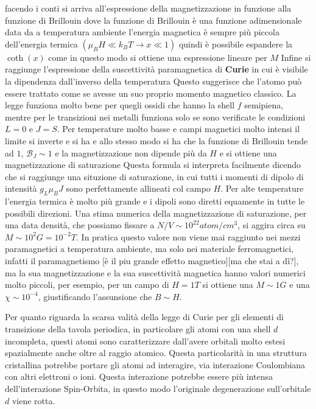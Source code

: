facendo i conti si arriva all'espressione della magnetizzazione in funzione alla funzione di Brillouin
dove la funzione di Brillouin è una funzione adimensionale data da
a temperatura ambiente l'energia magnetica è sempre più piccola dell'energia termica $(\mu_B H \ll k_BT \to x\ll 1)$ quindi è possibile espandere la $\coth(x)$ come  
in questo modo si ottiene una espressione lineare per $M$
Infine si raggiunge l'espressione della suscettività paramagnetica di \textbf{Curie} in cui è visibile la dipendenza dall'inverso della temperatura
Questo suggerisce che l'atomo può essere trattato come se avesse un suo proprio momento magnetico classico. La legge funziona molto bene per quegli ossidi che hanno la shell $f$ semipiena, mentre per le transizioni nei metalli funziona solo se sono verificate le condizioni $L=0$ e $J=S$. Per temperature molto basse e campi magnetici molto intensi il limite si inverte e si ha
e allo stesso modo si ha che la funzione di Brillouin tende ad $1$, $\mathcal{B}_J \sim 1$ e la magnetizzazione non dipende più da $H$ e si ottiene una magnetizzazione di saturazione
Questa formula si interpreta facilmente dicendo che si raggiunge una situzione di saturazione, in cui tutti i momenti di dipolo di intensit\`a $g_L \mu_B J$ sono perfettamente allineati col campo $H$. Per alte temperature l'energia termica \`e molto pi\`u grande e i dipoli sono diretti equamente in tutte le possibili direzioni. Una stima numerica della magnetizzazione di saturazione, per una data densit\`a, che possiamo fissare a $N/V\sim 10^{22} atom/cm^{3}$, si aggira circa su $M\sim10^2 G = 10^{-2}T$. In pratica questo valore non viene mai raggiunto nei mezzi paramagnetici a temperatura ambiente, ma solo nei materiale ferromagnetici, infatti il paramagnetismo [\`e il piu grande effetto magnetico][ma che stai a d\`i?], ma la sua magnetizzazione e la sua suscettivit\`a magnetica hanno valori numerici molto piccoli, per esempio, per un campo di $H=1T$ si ottiene una $M\sim 1G$ e una $\chi \sim 10^{-4}$, giustificando l'assunsione che $B\sim H$.

Per quanto riguarda la scarsa valit\`a della legge di Curie per gli elementi di transizione della tavola periodica, in particolare gli atomi con una shell $d$ incompleta, questi atomi sono caratterizzare dall'avere orbitali molto estesi spazialmente anche oltre al raggio atomico. Questa particolarit\`a in una struttura cristallina potrebbe portare gli atomi ad interagire, via interazione Coulombiana con altri elettroni o ioni. Questa interazione potrebbe essere pi\`u intensa dell'interazione Spin-Orbita, in questo modo l'originale degenerazione sull'orbitale $d$ viene rotta. 






